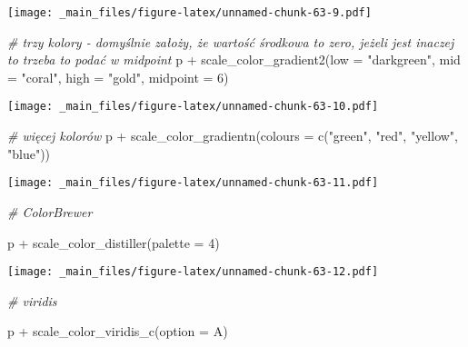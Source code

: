 \documentclass[
]{book}
\newenvironment{Shaded}{\begin{snugshade}}{\end{snugshade}}
\newcommand{\AttributeTok}[1]{\textcolor[rgb]{0.77,0.63,0.00}{#1}}
\newcommand{\CommentTok}[1]{\textcolor[rgb]{0.56,0.35,0.01}{\textit{#1}}}
\newcommand{\DecValTok}[1]{\textcolor[rgb]{0.00,0.00,0.81}{#1}}
\newcommand{\FunctionTok}[1]{\textcolor[rgb]{0.00,0.00,0.00}{#1}}
\newcommand{\NormalTok}[1]{#1}
\newcommand{\SpecialCharTok}[1]{\textcolor[rgb]{0.00,0.00,0.00}{#1}}
\newcommand{\StringTok}[1]{\textcolor[rgb]{0.31,0.60,0.02}{#1}}
\begin{document}
\texttt{[image: \_main\_files/figure-latex/unnamed-chunk-63-9.pdf]}

\begin{Shaded}
\begin{Highlighting}[]
\CommentTok{\# trzy kolory {-} domyślnie założy, że wartość środkowa to zero, jeżeli jest inaczej to trzeba to podać w midpoint}
\NormalTok{p }\SpecialCharTok{+} \FunctionTok{scale\_color\_gradient2}\NormalTok{(}\AttributeTok{low =} \StringTok{"darkgreen"}\NormalTok{, }\AttributeTok{mid =} \StringTok{"coral"}\NormalTok{, }\AttributeTok{high =} \StringTok{"gold"}\NormalTok{, }\AttributeTok{midpoint =} \DecValTok{6}\NormalTok{)}
\end{Highlighting}
\end{Shaded}

\texttt{[image: \_main\_files/figure-latex/unnamed-chunk-63-10.pdf]}

\begin{Shaded}
\begin{Highlighting}[]
\CommentTok{\# więcej kolorów}
\NormalTok{p }\SpecialCharTok{+} \FunctionTok{scale\_color\_gradientn}\NormalTok{(}\AttributeTok{colours =} \FunctionTok{c}\NormalTok{(}\StringTok{"green"}\NormalTok{, }\StringTok{"red"}\NormalTok{, }\StringTok{"yellow"}\NormalTok{, }\StringTok{"blue"}\NormalTok{))}
\end{Highlighting}
\end{Shaded}

\texttt{[image: \_main\_files/figure-latex/unnamed-chunk-63-11.pdf]}

\begin{Shaded}
\begin{Highlighting}[]
\CommentTok{\# ColorBrewer}

\NormalTok{p }\SpecialCharTok{+} \FunctionTok{scale\_color\_distiller}\NormalTok{(}\AttributeTok{palette =} \DecValTok{4}\NormalTok{)}
\end{Highlighting}
\end{Shaded}

\texttt{[image: \_main\_files/figure-latex/unnamed-chunk-63-12.pdf]}

\begin{Shaded}
\begin{Highlighting}[]
\CommentTok{\# viridis}

\NormalTok{p }\SpecialCharTok{+} \FunctionTok{scale\_color\_viridis\_c}\NormalTok{(}\AttributeTok{option =} \StringTok{\textquotesingle{}A\textquotesingle{}}\NormalTok{)}
\end{Highlighting}
\end{Shaded}
\end{document}

